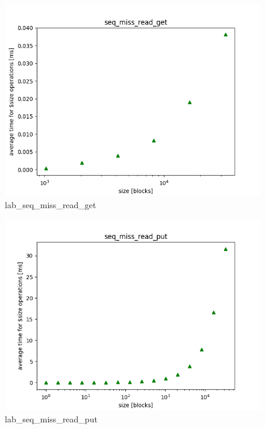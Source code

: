 \documentclass[twocolumn,11pt]{article}
\begin{document}
\begin{figure}[h!]
  \includegraphics[width=\linewidth]{Pictures/LABPC/seq_miss_read_complete_get.png}
  \caption{lab\_seq\_miss\_read\_get}
  \label{fig:lab_seq_miss_read_get}
\end{figure}
\begin{figure}[h!]
  \includegraphics[width=\linewidth]{Pictures/LABPC/seq_miss_read_complete_put.png}
  \caption{lab\_seq\_miss\_read\_put}
  \label{fig:lab_seq_miss_read_put}
\end{figure}
\end{document}
